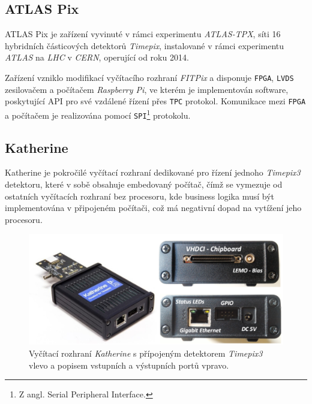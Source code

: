 \subsection{ATLAS Pix}\label{chap:detectors:readouts:atlaspix}
ATLAS Pix \cite{atlastpx_sw, BegeraBcThesis2016} je zařízení vyvinuté v rámci experimentu \textit{ATLAS-TPX}, síti 16 hybridních částicových detektorů \textit{Timepix}, instalované v rámci experimentu \textit{ATLAS} na \textit{LHC} v \textit{CERN}, operující od roku 2014.

Zařízení vzniklo modifikací vyčítacího rozhraní \textit{FITPix} a disponuje \texttt{FPGA}, \texttt{LVDS} zesilovačem a počítačem \textit{Raspberry Pi}, ve kterém je implementován software, poskytující API pro své vzdálené řízení přes \texttt{TPC} protokol. Komunikace mezi \texttt{FPGA} a počítačem je realizována pomocí \texttt{SPI}\footnote{Z angl. Serial Peripheral Interface.} protokolu.

\subsection{Katherine}\label{chap:detectors:readouts:katherine}

Katherine \cite{Katherine} je pokročilé vyčítací rozhraní dedikované pro řízení jednoho \textit{Timepix3} detektoru, které v sobě obsahuje embedovaný počítač, čímž se vymezuje od ostatních vyčítacích rozhraní bez procesoru, kde business logika musí být implementována v připojeném počítači, což má negativní dopad na vytížení jeho procesoru. 

\begin{figure}[h]
	\begin{center}
		\includegraphics[width=15cm]{figures/det_katherine.png}
		\caption{Vyčítací rozhraní \textit{Katherine} s přípojeným detektorem \textit{Timepix3} vlevo a popisem vstupních a výstupních portů vpravo\cite{Katherine}.}
		\label{fig:det:readout:katherine}
	\end{center}
\end{figure}

